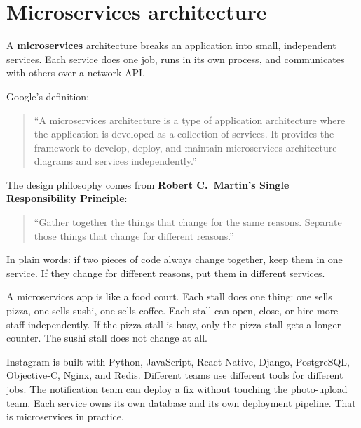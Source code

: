 \documentclass[a4paper,11pt]{article}
\newcommand{\vocab}[1]{\textbf{\color{navy}#1}}
\begin{document}
\section{Microservices architecture}

A \vocab{microservices} architecture breaks an application into small, independent services.
Each service does one job, runs in its own process, and communicates with others
over a network API.

Google's definition:
\begin{quote}
``A microservices architecture is a type of application architecture where the application
is developed as a collection of services.
It provides the framework to develop, deploy, and maintain microservices architecture
diagrams and services independently.''
\end{quote}

The design philosophy comes from \textbf{Robert C.\ Martin's Single Responsibility Principle}:
\begin{quote}
``Gather together the things that change for the same reasons.
Separate those things that change for different reasons.''
\end{quote}

In plain words: if two pieces of code always change together, keep them in one service.
If they change for different reasons, put them in different services.

\begin{intuition}
A microservices app is like a food court.
Each stall does one thing: one sells pizza, one sells sushi, one sells coffee.
Each stall can open, close, or hire more staff independently.
If the pizza stall is busy, only the pizza stall gets a longer counter.
The sushi stall does not change at all.
\end{intuition}

\begin{everyday}
Instagram is built with Python, JavaScript, React Native, Django, PostgreSQL,
Objective-C, Nginx, and Redis.
Different teams use different tools for different jobs.
The notification team can deploy a fix without touching the photo-upload team.
Each service owns its own database and its own deployment pipeline.
That is microservices in practice.
\end{everyday}

\end{document}
